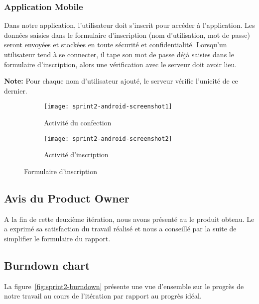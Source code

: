 \subsubsection{Application Mobile }

Dans notre application, l'utilisateur doit s'inscrit pour accéder à
l'application. Les données saisies dans le formulaire d'inscription (nom
d'utilisation, mot de passe) seront envoyées et stockées en toute sécurité et
confidentialité. Lorsqu'un utilisateur tend à se connecter, il tape son mot de
passe déjà saisies dans le formulaire d'inscription, alors une vérification
avec le serveur doit avoir lieu.

\textbf{Note:} Pour chaque nom d'utilisateur ajouté, le serveur vérifie
l'unicité de ce dernier.

\begin{figure}[htbp]
\centering
    \begin{subfigure}{.45\textwidth}
        \centering
        \centering
        \texttt{[image: sprint2-android-screenshot1]}
        \caption{Activité du confection}
\label{fig:sprint2-android-screenshot1}
    \end{subfigure}
    \begin{subfigure}{.45\textwidth}
        \centering
        \centering
        \texttt{[image: sprint2-android-screenshot2]}
        \caption{Activité d'inscription}
\label{fig:sprint2-android-screenshot2}
    \end{subfigure}
    \caption{Formulaire d'inscription}
\end{figure}

\subsection{Avis du Product Owner}

A la fin de cette deuxième itération, nous avons présenté au  le produit obtenu. Le  a exprimé sa
satisfaction du travail réalisé et nous a conseillé par la suite de simplifier
le formulaire du rapport.

\subsection{Burndown chart}

La figure~\ref{fig:sprint2-burndown} présente une vue d'ensemble sur le progrès
de notre travail au cours de l'itération par rapport au progrès idéal.


